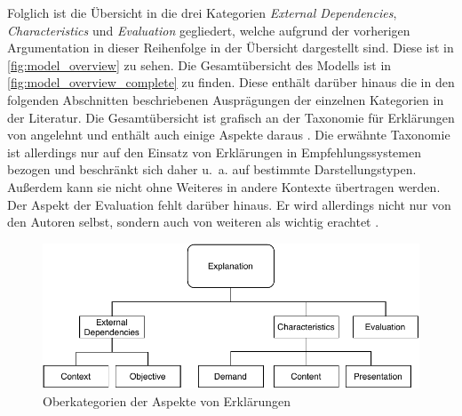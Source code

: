 \smallbreak

Folglich ist die Übersicht in die drei Kategorien \textit{External Dependencies}, \textit{Characteristics} und \textit{Evaluation} gegliedert, welche aufgrund der vorherigen Argumentation in dieser Reihenfolge in der Übersicht dargestellt sind. Diese ist in \autoref{fig:model_overview} zu sehen. Die Gesamtübersicht des Modells ist in \autoref{fig:model_overview_complete} zu finden. Diese enthält darüber hinaus die in den folgenden Abschnitten beschriebenen Ausprägungen der einzelnen Kategorien in der Literatur. Die Gesamtübersicht ist grafisch an der Taxonomie für Erklärungen von \citeauthor{nunes_systematic_2017} angelehnt und enthält auch einige Aspekte daraus \cite{nunes_systematic_2017}. Die erwähnte Taxonomie ist allerdings nur auf den Einsatz von Erklärungen in Empfehlungssystemen bezogen und beschränkt sich daher u.~a. auf bestimmte Darstellungstypen. Außerdem kann sie nicht ohne Weiteres in andere Kontexte übertragen werden. Der Aspekt der Evaluation fehlt darüber hinaus. Er wird allerdings nicht nur von den Autoren selbst, sondern auch von weiteren als wichtig erachtet \cite{cirqueira_scenario-based_2020, martin_evaluating_2021}.

\begin{figure}[htb!]
    \begin{center}
        \includegraphics[width=0.9\linewidth]{contents/05_model_description/res/model-overview.pdf}
    \end{center}
    \caption{Oberkategorien der Aspekte von Erklärungen}
    \label{fig:model_overview}
\end{figure}